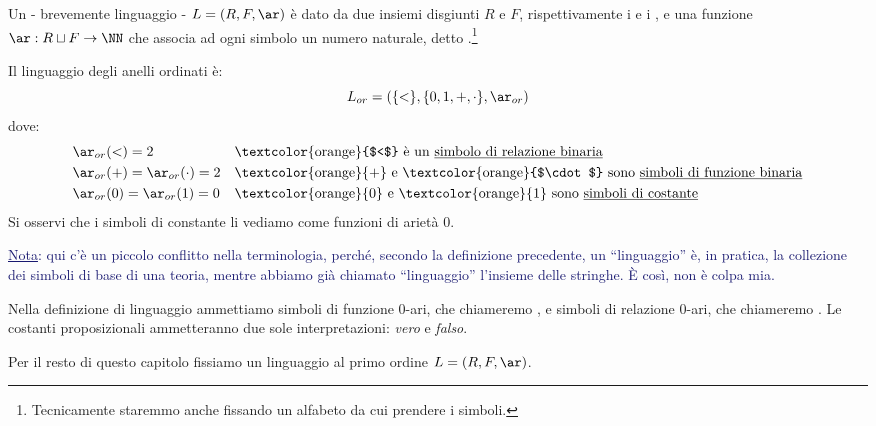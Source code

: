 \begin{definition}
    Un  - brevemente linguaggio - $L = (R,F,\ar)$ è dato da due insiemi disgiunti $R$ e $F$, rispettivamente i  e i , e una funzione
    $\ar : R \sqcup F \to \NN$ che associa ad ogni simbolo un numero naturale, detto .\footnote{Tecnicamente staremmo anche fissando un alfabeto da cui prendere i simboli.}
\end{definition}

\begin{example}
    Il linguaggio degli anelli ordinati è:
    \[ L_{or} = (\{<\},\{0,1,+,\cdot\},\ar_{or})
    \]
    dove:
    \begin{align*}
        &\ar_{or}(<) = 2 &&\text{\textcolor{orange}{$<$} è un \underline{simbolo di relazione binaria}} \\
        &\ar_{or}(+) = \ar_{or}(\cdot) = 2 &&\text{\textcolor{orange}{+} e \textcolor{orange}{$\cdot$} sono \underline{simboli di funzione binaria}} \\
        &\ar_{or}(0) = \ar_{or}(1) = 0 &&\text{\textcolor{orange}{0} e \textcolor{orange}{1} sono \underline{simboli di costante}}
    \end{align*}
    Si osservi che i simboli di constante li vediamo come funzioni di arietà 0.
\end{example}

\textcolor{MidnightBlue}{\underline{Nota}: qui c'è un piccolo conflitto nella terminologia, perché, secondo la definizione precedente, un ``linguaggio'' è, in pratica, la collezione dei simboli di base
di una teoria, mentre abbiamo già chiamato ``linguaggio'' l'insieme delle stringhe. È così, non è colpa mia.}

\begin{remark}
    Nella definizione di linguaggio ammettiamo simboli di funzione 0-ari, che chiameremo , e simboli di relazione 0-ari, che chiameremo .
    Le costanti proposizionali ammetteranno due sole interpretazioni: \emph{vero} e \emph{falso}.
\end{remark}

Per il resto di questo capitolo fissiamo un linguaggio al primo ordine $L = (R,F,\ar)$.

